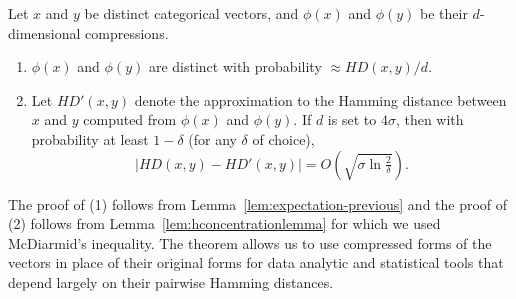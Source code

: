 \begin{thm} \label{thm:main-intro} Let $x$ and $y$ be distinct categorical vectors, and $\phi(x)$ and $\phi(y)$ be their $d$-dimensional compressions.
\begin{enumerate}
    \item $\phi(x)$ and $\phi(y)$ are distinct with probability $\approx HD(x,y)/d$.
    \item Let $HD'(x,y)$ denote the approximation to the Hamming distance between $x$ and $y$ computed from $\phi(x)$ and $\phi(y)$. If $d$ is set to $4\sigma$, then with probability at least $1-\delta$ (for any $\delta$ of choice), $$\big|HD(x,y) - HD'(x,y)\big| = { O \left( \sqrt{\sigma \ln \tfrac{2}{\delta}}\right)}.$$
\end{enumerate}
\end{thm}

The proof of (1) follows from Lemma~\ref{lem:expectation-previous} and the proof of (2) follows from Lemma~\ref{lem:hconcentrationlemma} for which we used McDiarmid's inequality. The theorem allows us to use compressed forms of the vectors in place of their original forms for data analytic and statistical tools that depend largely on their pairwise Hamming distances.




